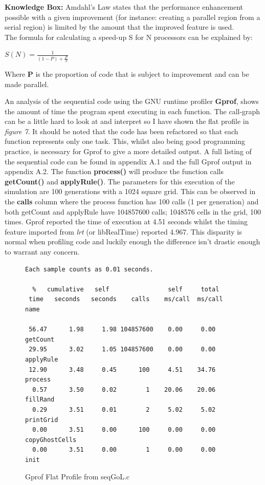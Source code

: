 \documentclass[11pt]{article} %
\begin{document}
\bigskip
\begin{mdframed}
{\bf Knowledge Box:} Amdahl's Law states that the performance enhancement possible with a given improvement (for instance: creating a parallel region from a serial region) is limited by the amount that the improved feature is used. \cite[Patterson, Hennessey, p51]{ref10}\\ The formula for calculating a speed-up S for N processors can be explained by:\bigskip

\centerline{$ S(N) = \frac{1}{(1-P) + \frac{P}{N}} $}
\smallskip
Where {\bf P} is the proportion of code that is subject to improvement and can be made parallel.
\end{mdframed}
\bigskip
An analysis of the sequential code using the GNU runtime profiler {\bf Gprof}, shows the amount of time the program spent executing in each function. The call-graph can be a little hard to look at and interpret so I have shown the flat profile in {\it figure 7}. It should be noted that the code has been refactored so that each function represents only one task. This, whilst also being good programming practice, is necessary for Gprof to give a more detailed output. A full listing of the sequential code can be found in appendix A.1 and the full Gprof output in appendix A.2. The function {\bf process()} will produce the function calls {\bf getCount()} and {\bf applyRule()}. The parameters for this execution of the simulation are 100 generations with a 1024 square grid. This can be observed in the {\bf calls} column where the process function has 100 calls (1 per generation) and both getCount and applyRule have 104857600 calls; 1048576 cells in the grid, 100 times. Gprof reported the time of execution at 4.51 seconds whilst the timing feature imported from {\it lrt} (or libRealTime) reported 4.967. This disparity is normal when profiling code and luckily enough the difference isn't drastic enough to warrant any concern.\\
\begin{figure}[h]
\caption{Gprof Flat Profile from seqGoL.c}
\begin{verbatim}Each sample counts as 0.01 seconds.

  %   cumulative   self                self     total           
 time   seconds   seconds    calls    ms/call  ms/call  name    

 56.47      1.98     1.98 104857600    0.00     0.00    getCount
 29.95      3.02     1.05 104857600    0.00     0.00    applyRule
 12.90      3.48     0.45      100     4.51    34.76    process
  0.57      3.50     0.02        1    20.06    20.06    fillRand
  0.29      3.51     0.01        2     5.02     5.02    printGrid
  0.00      3.51     0.00      100     0.00     0.00    copyGhostCells
  0.00      3.51     0.00        1     0.00     0.00    init
\end{verbatim}
\end{figure}
\end{document}
